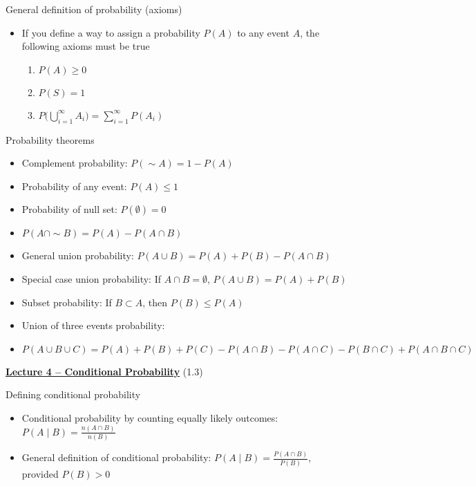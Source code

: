 \documentclass{article}
\newcommand{\bu}[1]{\textbf{\ul{#1}}}				%
\newcommand{\comp}{{\sim}}			%
\begin{document}
General definition of probability (axioms)
\begin{itemize}
    \item If you define a way to assign a probability $P(A)$ to any event $A$, the following axioms must be true
    \begin{enumerate}
        \item $P(A) \ge 0$
        \item $P(S) = 1$
        \item $\displaystyle P\big(\bigcup_{i=1}^{\infty}A_i\big ) = \sum_{i=1}^{\infty} P(A_i)$
    \end{enumerate}
\end{itemize}\bigskip

Probability theorems
\begin{itemize}
    \item Complement probability: $P(\comp A) = 1 - P(A)$
    \item Probability of any event: $P(A) \le 1$
    \item Probability of null set: $P(\emptyset) = 0$
    \item $P(A \cap \comp B) = P(A) - P(A \cap B)$
    \item General union probability: $P(A \cup B) = P(A) + P(B) - P(A \cap B)$
    \item Special case union probability: If $A \cap B = \emptyset$, $P(A \cup B) = P(A) + P(B)$
    \item Subset probability: If $B \subset A$, then $P(B) \le P(A)$
    \item Union of three events probability:
    \item[] $P(A \cup B \cup C) = P(A) + P(B) + P(C) - P(A \cap B) - P(A \cap C) - P(B \cap C) + P(A \cap B \cap C)$
\end{itemize}

\vspace{100pt}

{\large \bu{Lecture 4 -- Conditional Probability}} (1.3)\bigskip

Defining conditional probability
\begin{itemize}
    \item Conditional probability by counting equally likely outcomes: $\displaystyle P(A \mid B) = \frac{n(A \cap B)}{n(B)}$
    \item General definition of conditional probability: $\displaystyle P(A \mid B) = \frac{P(A \cap B)}{P(B)}$,\\provided $P(B) > 0$
\end{itemize}\bigskip
\end{document}

